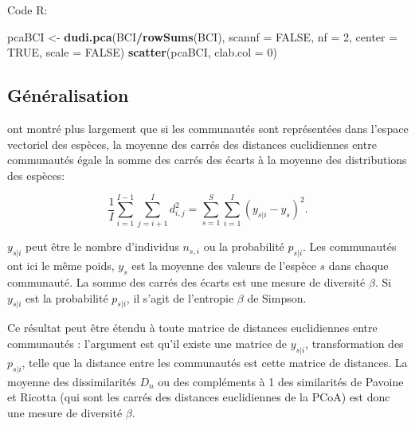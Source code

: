 \documentclass[
  11pt,
  french,
  a4paper,
  extrafontsizes,onecolumn,openright
  ]{memoir}
\newenvironment{Shaded}{\begin{snugshade}}{\end{snugshade}}
\newcommand{\DataTypeTok}[1]{\textcolor[rgb]{0.13,0.29,0.53}{#1}}
\newcommand{\DecValTok}[1]{\textcolor[rgb]{0.00,0.00,0.81}{#1}}
\newcommand{\KeywordTok}[1]{\textcolor[rgb]{0.13,0.29,0.53}{\textbf{#1}}}
\newcommand{\NormalTok}[1]{#1}
\newcommand{\OperatorTok}[1]{\textcolor[rgb]{0.81,0.36,0.00}{\textbf{#1}}}
\newcommand{\OtherTok}[1]{\textcolor[rgb]{0.56,0.35,0.01}{#1}}
\newcommand{\StringTok}[1]{\textcolor[rgb]{0.31,0.60,0.02}{#1}}
\begin{document}
Code R:

\scriptsize

\begin{Shaded}
\begin{Highlighting}[]
\NormalTok{pcaBCI <-}\StringTok{ }\KeywordTok{dudi.pca}\NormalTok{(BCI}\OperatorTok{/}\KeywordTok{rowSums}\NormalTok{(BCI), }\DataTypeTok{scannf =} \OtherTok{FALSE}\NormalTok{, }\DataTypeTok{nf =} \DecValTok{2}\NormalTok{,}
    \DataTypeTok{center =} \OtherTok{TRUE}\NormalTok{, }\DataTypeTok{scale =} \OtherTok{FALSE}\NormalTok{)}
\KeywordTok{scatter}\NormalTok{(pcaBCI, }\DataTypeTok{clab.col =} \DecValTok{0}\NormalTok{)}
\end{Highlighting}
\end{Shaded}

\normalsize

\hypertarget{guxe9nuxe9ralisation}{%
\subsection{Généralisation}\label{guxe9nuxe9ralisation}}

\textcite{Legendre1999} ont montré plus largement que si les communautés sont représentées dans l'espace vectoriel des espèces, la moyenne des carrés des distances euclidiennes entre communautés égale la somme des carrés des écarts à la moyenne des distributions des espèces:

\begin{equation}
  \label{eq:Legendre1999}
  \frac{1}{I} \sum_{i=1}^{I-1}{\sum_{j=i+1}^{I}{d_{i,j}^2}}
  = \sum_{s=1}^{S}{\sum_{i=1}^{I}{\left(y_{s|i}-y_s \right)^2}}.
\end{equation}

\(y_{s|i}\) peut être le nombre d'individus \(n_{s,i}\) ou la probabilité \(p_{s|i}\).
Les communautés ont ici le même poids, \(y_s\) est la moyenne des valeurs de l'espèce \(s\) dans chaque communauté.
La somme des carrés des écarts est une mesure de diversité \(\beta\).
Si \(y_{s|i}\) est la probabilité \(p_{s|i}\), il s'agit de l'entropie \(\beta\) de Simpson.

Ce résultat peut être étendu à toute matrice de distances euclidiennes entre communautés \autocite{Legendre2005} : l'argument est qu'il existe une matrice de \(y_{s|i}\), transformation des \(p_{s|i}\), telle que la distance entre les communautés est cette matrice de distances.
La moyenne des dissimilarités \(D_n\) ou des compléments à 1 des similarités de Pavoine et Ricotta (qui sont les carrés des distances euclidiennes de la PCoA) est donc une mesure de diversité \(\beta\).
\end{document}
